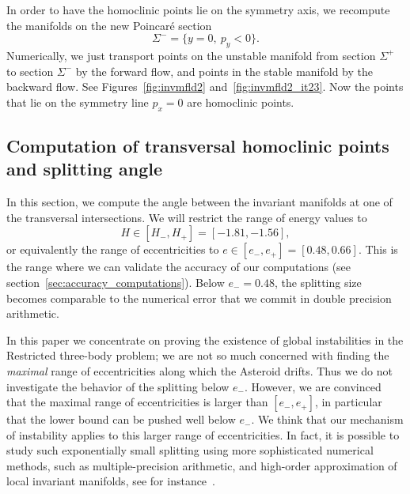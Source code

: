 In order to have the homoclinic points lie on the symmetry axis, we
recompute the manifolds on the new Poincar\'e section
\[ \Sigma^- = \{y=0,\ p_y<0\}. \]
Numerically, we just transport points on the unstable manifold from
section $\Sigma^+$ to section $\Sigma^-$ by the forward flow, and
points in the stable manifold by the backward flow.
See Figures~\ref{fig:invmfld2} and~\ref{fig:invmfld2_it23}.
Now the points that lie on the symmetry line $p_x=0$ are homoclinic
points.


\subsection{Computation of transversal homoclinic points and splitting
angle}
\label{sec:homoclinic_points}


In this section, we compute the angle between the invariant manifolds
at one of the  transversal intersections. 
We will restrict the range of energy values to
\[ H\in[H_-,H_+]=[-1.81,-1.56], \]
or equivalently the range of eccentricities to
$ e\in[e_-,e_+]=[0.48,0.66]$.
This is the range where we can validate the accuracy of our
computations (see section~\ref{sec:accuracy_computations}).
Below $e_-=0.48$, the splitting size becomes comparable to the
numerical error that we commit in double precision arithmetic. 

\begin{remark}
In this paper we concentrate on proving the existence of global
instabilities in the Restricted three-body problem; we are not so much
concerned with finding the \emph{maximal} range of eccentricities
along which the Asteroid drifts.
Thus we do not investigate the behavior of the splitting below
$e_-$.
However, we are convinced that the maximal range of eccentricities is
larger than $[e_-,e_+]$, in particular that the lower bound can be
pushed well below $e_-$.  
We think that our mechanism of instability applies to this larger
range of eccentricities.
In fact, it is possible to study such exponentially small splitting
using more sophisticated numerical methods, such as multiple-precision
arithmetic, and high-order approximation of local invariant manifolds,
see for instance~\cite{FontichSimo1990, DelshamsRamirez1999,
GelfreichSimo2008}.
\end{remark}

